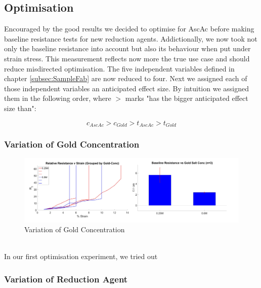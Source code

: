 \subsection{Optimisation}
Encouraged by the good results we decided to optimise for AscAc before making baseline resistance tests for new reduction agents. Addictionally, we now took not only the baseline resistance into account but also its behaviour when put under strain stress. This measurement reflects now more the true use case and should reduce misdirected optimisation. The five independent variables defined in chapter \ref{subsec:SampleFab} are now reduced to four. Next we assigned each of those independent variables an anticipated effect size. By intuition we assigned them in the following order, where $>$ marks "has the bigger anticipated effect size than":

\begin{equation}
    c_{AscAc} > c_{Gold} > t_{AscAc} > t_{Gold}
\end{equation}

\subsubsection{Variation of Gold Concentration}

\begin{figure}[hb!]
    \centerline{\includegraphics[scale=0.7]{./pic/R0vGoldConc.PNG}}
    \caption{Variation of Gold Concentration}
    \label{fig:GoldConc}
\end{figure}


\\

In our first optimisation experiment, we tried out  

\subsubsection{Variation of Reduction Agent}